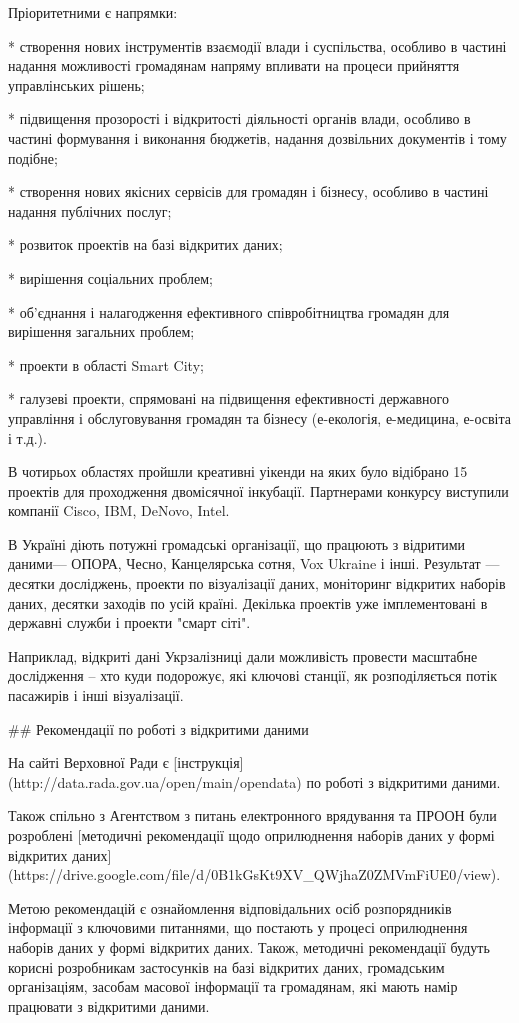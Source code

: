 Пріоритетними є напрямки:

* створення нових інструментів взаємодії влади і суспільства, особливо в частині надання можливості громадянам напряму впливати на процеси прийняття управлінських рішень;

* підвищення прозорості і відкритості діяльності органів влади, особливо в частині формування і виконання бюджетів, надання дозвільних документів і тому подібне;

* створення нових якісних сервісів для громадян і бізнесу, особливо в частині надання публічних послуг;

* розвиток проектів на базі відкритих даних;

* вирішення соціальних проблем;

* об'єднання і налагодження ефективного співробітництва громадян для вирішення загальних проблем;

* проекти в області Smart City;

* галузеві проекти, спрямовані на підвищення ефективності державного управління і обслуговування громадян та бізнесу (е-екологія, е-медицина, е-освіта і т.д.).

В чотирьох областях пройшли креативні уікенди на яких було відібрано 15 проектів для проходження двомісячної інкубації. Партнерами конкурсу виступили компанії Cisco, IBM, DeNovo, Intel.

В Україні діють потужні громадські організації, що працюють з відритими даними— ОПОРА, Чесно, Канцелярська сотня, Vox Ukraine і інші. Результат — десятки досліджень, проекти по візуалізації даних, моніторинг відкритих наборів даних, десятки заходів по усій країні. Декілька проектів уже імплементовані в державні служби і проекти "смарт сіті". 

Наприклад, відкриті дані Укрзалізниці дали можливість провести масштабне дослідження – хто куди подорожує, які ключові станції, як розподіляється потік пасажирів і інші візуалізації.

## Рекомендації по роботі з відкритими даними

На сайті Верховної Ради є [інструкція](http://data.rada.gov.ua/open/main/opendata) по роботі з відкритими даними.

Також спільно з Агентством з питань електронного врядування та ПРООН були розроблені [методичні рекомендації щодо оприлюднення наборів даних у формі відкритих даних](https://drive.google.com/file/d/0B1kGsKt9XV_QWjhaZ0ZMVmFiUE0/view).

Метою рекомендацій є ознайомлення відповідальних осіб розпорядників інформації з ключовими питаннями, що постають у процесі оприлюднення наборів даних у формі відкритих даних. Також, методичні рекомендації будуть корисні розробникам застосунків на базі відкритих даних, громадським організаціям, засобам масової інформації та громадянам, які мають намір працювати з відкритими даними.

